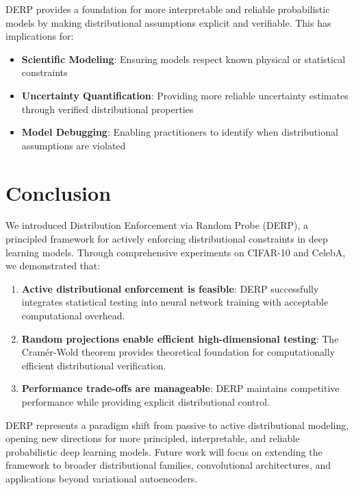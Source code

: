 \documentclass{article}
\begin{document}
DERP provides a foundation for more interpretable and reliable probabilistic models by making distributional assumptions explicit and verifiable. This has implications for:

\begin{itemize}
    \item \textbf{Scientific Modeling}: Ensuring models respect known physical or statistical constraints
    \item \textbf{Uncertainty Quantification}: Providing more reliable uncertainty estimates through verified distributional properties  
    \item \textbf{Model Debugging}: Enabling practitioners to identify when distributional assumptions are violated
\end{itemize}

\section{Conclusion}

We introduced Distribution Enforcement via Random Probe (DERP), a principled framework for actively enforcing distributional constraints in deep learning models. Through comprehensive experiments on CIFAR-10 and CelebA, we demonstrated that:

\begin{enumerate}
    \item \textbf{Active distributional enforcement is feasible}: DERP successfully integrates statistical testing into neural network training with acceptable computational overhead.
    
    \item \textbf{Random projections enable efficient high-dimensional testing}: The Cramér-Wold theorem provides theoretical foundation for computationally efficient distributional verification.
    
    \item \textbf{Performance trade-offs are manageable}: DERP maintains competitive performance while providing explicit distributional control.
\end{enumerate}

DERP represents a paradigm shift from passive to active distributional modeling, opening new directions for more principled, interpretable, and reliable probabilistic deep learning models. Future work will focus on extending the framework to broader distributional families, convolutional architectures, and applications beyond variational autoencoders.
\end{document}
